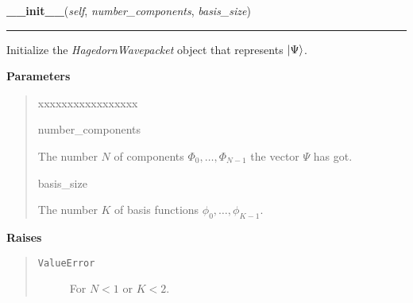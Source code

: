 \hspace{.8\funcindent}\begin{boxedminipage}{\funcwidth}

    \raggedright \textbf{\_\_init\_\_}(\textit{self}, \textit{number\_components}, \textit{basis\_size})

    \vspace{-1.5ex}

    \rule{\textwidth}{0.5\fboxrule}
\setlength{\parskip}{2ex}
    Initialize the \textit{HagedornWavepacket} object that represents
    $\Ket{\Psi}$.

\setlength{\parskip}{1ex}
      \textbf{Parameters}
      \vspace{-1ex}

      \begin{quote}
        \begin{Ventry}{xxxxxxxxxxxxxxxxx}

          \item[number\_components]

          The number $N$ of components $\Phi_0,
          \ldots , \Phi_{N-1}$ the vector
          $\Psi$ has got.

          \item[basis\_size]

          The number $K$ of basis functions $\phi_0,
          \ldots , \phi_{K-1}$.

        \end{Ventry}

      \end{quote}

      \textbf{Raises}
    \vspace{-1ex}

      \begin{quote}
        \begin{description}

          \item[\texttt{ValueError}]

          For $N < 1$ or $K < 2$.

        \end{description}

      \end{quote}

    \end{boxedminipage}

    \label{HagedornWavepacket:HagedornWavepacket:__str__}


